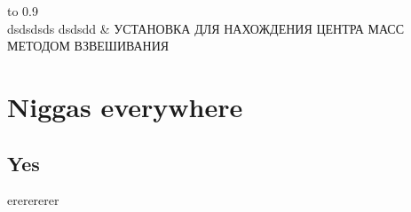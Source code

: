\documentclass{report}
\begin{document}
	\begin{titlepage}

		\color{MidnightBlue}
		\fontsize{36}{42}\setlength{\parindent}{0pt}
		\selectfont
	
		\begin{tabu} to 0.9\textwidth{ X[l] | X[r]}
			\hline
			 \\
			\hline
				dsdsdsds dsdsdd & УСТАНОВКА ДЛЯ НАХОЖДЕНИЯ ЦЕНТРА МАСС МЕТОДОМ ВЗВЕШИВАНИЯ \\
			\hline
		\end{tabu}

	\end{titlepage}

	\tableofcontents

	\chapter{Niggas everywhere}

	\section{Yes}
		ererererer
\end{document}
